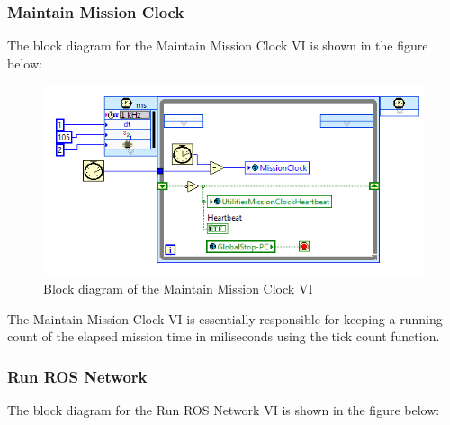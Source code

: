 \subsubsection{Maintain Mission Clock}

The block diagram for the Maintain Mission Clock VI is shown in the figure below:

\begin{figure}[h!]
\centering
\includegraphics[scale=0.85]{Photos/maintainmissionclock.png}
\caption{Block diagram of the Maintain Mission Clock VI}
\label{fig:maintainmissionclock}
\end{figure}

\noindent The Maintain Mission Clock VI is essentially responsible for keeping a running count of the elapsed mission time in miliseconds using the tick count function. 

\newpage

\subsubsection{Run ROS Network}

The block diagram for the Run ROS Network VI is shown in the figure below:

